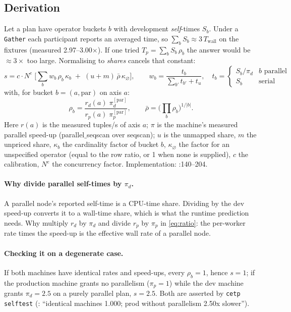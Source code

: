 \subsection{Derivation}
Let a plan have operator buckets $b$ with development \emph{self}-times $S_b$. Under a \texttt{Gather} each
participant reports an averaged time, so $\sum_b S_b\approx 3\,T_{\text{wall}}$ on the fixtures (measured
2.97--3.00$\times$). If one tried $T_p=\sum_b S_b\,\rho_b$ the answer would be $\approx3\times$ too large. Normalising
to \emph{shares} cancels that constant:
\begin{equation}\label{eq:gen2}
s=c\cdot N^{e}\;\Big[\sum_{b} w_b\,\rho_b\,\kappa_b \;+\;(u+m)\,\bar\rho\,\kappa_{\varnothing}\Big],\qquad
w_b=\frac{t_b}{\sum_{b'}t_{b'}+t_u},\quad t_b=\begin{cases}S_b/\pi_d&b\text{ parallel}\\ S_b&\text{serial}\end{cases}
\end{equation}
with, for bucket $b=(a,\text{par})$ on axis $a$:
\begin{equation}\label{eq:ratio}
\rho_b=\frac{r_d(a)\;\pi_d^{[\text{par}]}}{r_p(a)\;\pi_p^{[\text{par}]}},\qquad
\bar\rho=\Big(\prod_b\rho_b\Big)^{1/|b|}.
\end{equation}
Here $r(a)$ is the measured tuples/s of axis $a$; $\pi$ is the machine's measured parallel speed-up
(parallel$\_$seqscan over seqscan); $u$ is the unmapped share, $m$ the unpriced share, $\kappa_b$ the
cardinality factor of bucket $b$, $\kappa_{\varnothing}$ the factor for an unspecified operator (equal to the row ratio, or 1 when none is supplied), $c$ the calibration, $N^{e}$ the concurrency factor. Implementation:
:140--204.

\paragraph{Why divide parallel self-times by $\pi_d$.}
A parallel node's reported self-time is a CPU-time share. Dividing by the dev speed-up converts it to a
wall-time share, which is what the runtime prediction needs. Why multiply $r_d$ by $\pi_d$ and divide $r_p$ by
$\pi_p$ in \eqref{eq:ratio}: the per-worker rate times the speed-up is the effective wall rate of a parallel node.

\paragraph{Checking it on a degenerate case.} If both machines have identical rates and speed-ups, every
$\rho_b=1$, hence $s=1$; if the production machine grants no parallelism ($\pi_p=1$) while the dev machine
grants $\pi_d=2.5$ on a purely parallel plan, $s=2.5$. Both are asserted by \texttt{cetp selftest}
(\evRUN: ``identical machines 1.000; prod without parallelism 2.50x slower'').

